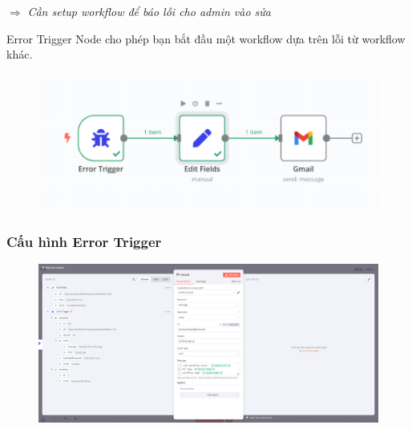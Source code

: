 $\Rightarrow$ \textit{Cần setup workflow để báo lỗi cho admin vào sửa}

\newpage

Error Trigger Node cho phép bạn bắt đầu một workflow dựa trên lỗi từ workflow khác.

\begin{figure}[htbp]
    \centering
    \includegraphics[width=1\linewidth]{Chap1-7/error.pdf}
\end{figure}

\subsubsection{Cấu hình Error Trigger}

\begin{figure}[htbp]
    \centering
    \includegraphics[width=1\linewidth]{Chap1-7/mess_error.pdf}
\end{figure}

